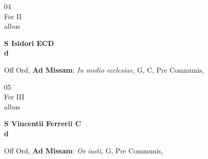 \documentclass[10pt, openany]{book}
\begin{document}
        \begin{center}
            \begin{minipage}{3.5in}
                \vspace{2em}
                \begin{minipage}{0.5in}
                    {\Huge 04} \\
                    {\normalsize Fer II} \\
                    {\normalsize albus}
                \end{minipage}
                \begin{minipage}{3.0in}
                    \textbf{ \large S Isidori ECD \\
                    \textnormal{\normalsize d}} \\ 
                \end{minipage}
                \begin{justify}Off Ord, \textbf{Ad Missam}: \textit{In medio ecclesiae,} G, C, Pre Communis,   
                \end{justify}
            \end{minipage}
        \end{center}
    
        \begin{center}
            \begin{minipage}{3.5in}
                \vspace{2em}
                \begin{minipage}{0.5in}
                    {\Huge 05} \\
                    {\normalsize Fer III} \\
                    {\normalsize albus}
                \end{minipage}
                \begin{minipage}{3.0in}
                    \textbf{ \large S Vincentii Ferrerii C \\
                    \textnormal{\normalsize d}} \\ 
                \end{minipage}
                \begin{justify}Off Ord, \textbf{Ad Missam}: \textit{Os iusti,} G, Pre Communis,   
                \end{justify}
            \end{minipage}
        \end{center}
    
\end{document}
